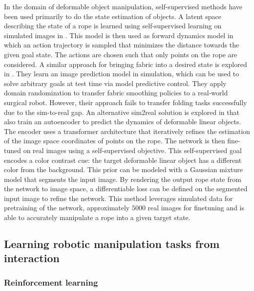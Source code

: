 \documentclass[\home/main.tex]{subfiles}
\begin{document}
In the domain of deformable object manipulation, self-supervised methods have been used primarily to do the state estimation of objects. A latent space describing the state of a rope is learned using self-supervised learning on simulated images in \autocite{yan2020learning}. This model is then used as forward dynamics model in which an action trajectory is sampled that minimizes the distance towards the given goal state. The actions are chosen such that only points on the rope are considered. A similar approach for bringing fabric into a desired state is explored in \autocite{fabric_vsf_2020}. They learn an image prediction model in simulation, which can be used to solve arbitrary goals at test time via model predictive control. They apply domain randomization to transfer fabric smoothing policies to a real-world surgical robot. However, their approach fails to transfer folding tasks successfully due to the sim-to-real gap. An alternative sim2real solution is explored in \autocite{Mengyuan2020} that also train an autoencoder to predict the dynamics of deformable linear objects. The encoder uses a transformer architecture \autocite{vaswani2017attention} that iteratively refines the estimation of the image space coordinates of points on the rope. The network is then fine-tuned on real images using a self-supervised objective. This self-supervised goal encodes a color contrast cue: the target deformable linear object has a different color from the background. This prior can be modeled with a Gaussian mixture model that segments the input image. By rendering the output rope state from the network to image space, a differentiable loss can be defined on the segmented input image to refine the network. This method leverages simulated data for pretraining of the network, approximately $5000$ real images for finetuning and is able to accurately manipulate a rope into a given target state.

\subsection{Learning robotic manipulation tasks from interaction} \label{subsec:lit_rl}
\subsubsection{Reinforcement learning}
\end{document}
